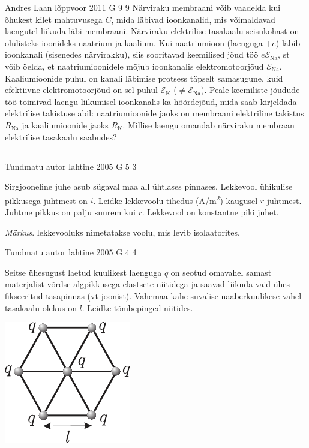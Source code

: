 \documentclass[11pt]{article}
\begin{document}
{%
{Andres Laan} %
{lõppvoor} %
{2011} %
{G 9} %
{9} %
{
\ifStatement
Närviraku membraani võib vaadelda kui õhukest kilet mahtuvusega $C$, mida läbivad ioonkanalid, mis võimaldavad laengutel liikuda läbi
membraani. Närviraku elektrilise tasakaalu seisukohast on olulisteks ioonideks
naatrium ja kaalium. Kui naatriumioon (laenguga $+e$) läbib ioonkanali (sisenedes närvirakku), siis sooritavad keemilised jõud töö $e\mathcal{E}_{\mathrm{Na}}$, st võib öelda, et
naatriumioonidele mõjub ioonkanalis elektromotoorjõud $\mathcal{E}_{\mathrm{Na}}$. Kaaliumioonide
puhul on kanali läbimise protsess täpselt samasugune, kuid efektiivne elektromotoorjõud on sel puhul $\mathcal{E}_{\mathrm{K}}$ ($\neq \mathcal{E}_{\mathrm{Na}}$). Peale keemiliste jõudude töö toimivad
laengu liikumisel ioonkanalis ka hõõrdejõud, mida saab kirjeldada elektrilise
takistuse abil: naatriumioonide jaoks on membraani elektriline takistus $R_{\mathrm{Na}}$ ja kaaliumioonide jaoks $R_{\mathrm{K}}$. Millise laengu omandab närviraku membraan
elektrilise tasakaalu saabudes? 
\fi
}
\newpage\subsection{\protect{}}

{Tundmatu autor} %
{lahtine} %
{2005} %
{G 5} %
{3} %
{
\ifStatement
Sirgjooneline juhe asub sügaval maa all ühtlases pinnases. Lekkevool ühikulise pikkusega juhtmest on $i$. Leidke lekkevoolu tihedus (\si{A/m^2}) kaugusel $r$ juhtmest. Juhtme pikkus on palju suurem kui $r$. Lekkevool on konstantne piki juhet.

\emph{Märkus}. lekkevooluks nimetatakse voolu, mis levib isolaatorites. 
\fi
}

{Tundmatu autor} %
{lahtine} %
{2005} %
{G 4} %
{4} %
{
\ifStatement
Seitse ühesugust laetud kuulikest laenguga $q$ on seotud omavahel samast materjalist võrdse algpikkusega elastsete niitidega ja saavad liikuda vaid ühes fikseeritud tasapinnas (vt joonist). Vahemaa kahe suvalise naaberkuulikese vahel tasakaalu olekus on $l$. Leidke tõmbepinged niitides.

\begin{center}
	\includegraphics[width=0.35\linewidth]{2005-lahg-04-yl}
\end{center}
\fi
}

}
\end{document}
